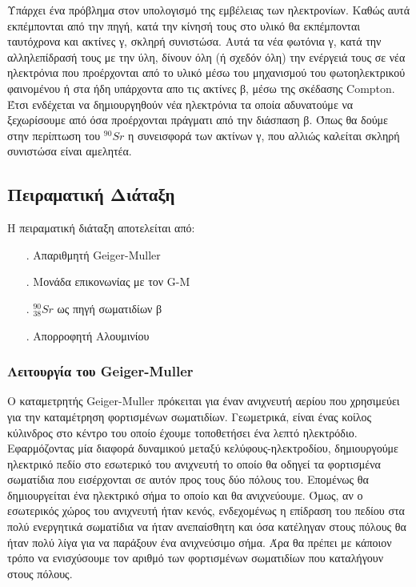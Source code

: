 \documentclass[a4paper]{article}
\begin{document}
	Υπάρχει ένα πρόβλημα στον υπολογισμό της εμβέλειας των ηλεκτρονίων. Καθώς αυτά εκπέμπονται από την πηγή, κατά την κίνησή τους στο υλικό θα εκπέμπονται ταυτόχρονα και ακτίνες γ, σκληρή συνιστώσα. 
	Αυτά τα νέα φωτόνια γ, κατά την αλληλεπίδρασή τους με την ύλη, δίνουν όλη (ή σχεδόν όλη) την ενέργειά τους σε νέα ηλεκτρόνια που προέρχονται από το υλικό μέσω του μηχανισμού του φωτοηλεκτρικού φαινομένου ή στα ήδη υπάρχοντα απο τις ακτίνες β, μέσω της σκέδασης Compton. Έτσι ενδέχεται να δημιουργηθούν νέα ηλεκτρόνια τα οποία αδυνατούμε να ξεχωρίσουμε από όσα προέρχονται πράγματι από την διάσπαση β. Όπως θα δούμε στην περίπτωση του $^{90}Sr$ η συνεισφορά των ακτίνων γ, που αλλιώς καλείται σκληρή συνιστώσα είναι αμελητέα.
	
	
\subsection*{Πειραματική Διάταξη}
	 Η πειραματική διάταξη αποτελείται από: 
	 	\begin{itemize}
	 		\item[.] Απαριθμητή Geiger-Muller
	 		\item[.] Μονάδα επικονωνίας με τον G-M
	 		\item[.] $^{90}_{38}Sr$ ως πηγή σωματιδίων β
	 		\item[.] Απορροφητή Αλουμινίου
	 	\end{itemize}
	 	
\subsubsection*{Λειτουργία του Geiger-Muller}
	
	Ο καταμετρητής Geiger-Muller πρόκειται για έναν ανιχνευτή αερίου που χρησιμεύει για την καταμέτρηση φορτισμένων σωματιδίων. Γεωμετρικά, είναι ένας κοίλος κύλινδρος στο κέντρο του οποίο έχουμε τοποθετήσει ένα λεπτό ηλεκτρόδιο. Εφαρμόζοντας μία διαφορά δυναμικού μεταξύ κελύφους-ηλεκτροδίου, δημιουργούμε ηλεκτρικό πεδίο στο εσωτερικό του ανιχνευτή το οποίο θα οδηγεί τα φορτισμένα σωματίδια που εισέρχονται σε αυτόν προς τους δύο πόλους του. Επομένως θα δημιουργείται ένα ηλεκτρικό σήμα το οποίο και θα ανιχνεύουμε. Όμως, αν ο εσωτερικός χώρος του ανιχνευτή ήταν κενός, ενδεχομένως η επίδραση του πεδίου στα πολύ ενεργητικά σωματίδια να ήταν ανεπαίσθητη και όσα κατέληγαν στους πόλους θα ήταν πολύ λίγα για να παράξουν ένα ανιχνεύσιμο σήμα. Άρα θα πρέπει με κάποιον τρόπο να ενισχύσουμε τον αριθμό των φορτισμένων σωματιδίων που καταλήγουν στους πόλους. 
	
\end{document}
